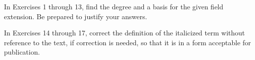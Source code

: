\documentclass[11pt,oneside]{article}
\begin{document}
\begin{BookBody}



\noindent In Exercises 1 through 13, find the degree and a basis for the given field extension. Be prepared to justify your answers.















\noindent In Exercises 14 through 17, correct the definition of the italicized term without reference to the text, if correction is needed, so that it is in a form acceptable for publication.


\end{BookBody}
\end{document}

